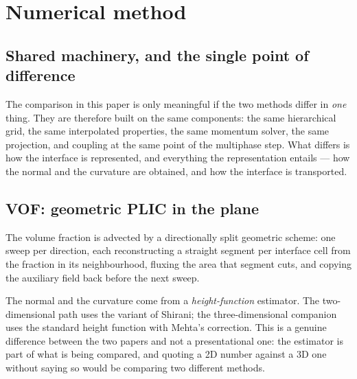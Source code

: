 \section{Numerical method}\label{sec:method}


\subsection{Shared machinery, and the single point of difference}

The comparison in this paper is only meaningful if the two methods differ in
\emph{one} thing. They are therefore built on the same components: the same
hierarchical grid, the same interpolated properties, the same momentum solver,
the same projection, and coupling at the same point of the multiphase step.
What differs is how the interface is represented, and everything the
representation entails --- how the normal and the curvature are obtained, and
how the interface is transported.


\subsection{VOF: geometric PLIC in the plane}

The volume fraction is advected by a directionally split geometric scheme: one
sweep per direction, each reconstructing a straight segment per interface cell
from the fraction in its neighbourhood, fluxing the area that segment cuts, and
copying the auxiliary field back before the next sweep.

The normal and the curvature come from a \emph{height-function} estimator. The
two-dimensional path uses the variant of Shirani; the three-dimensional
companion uses the standard height function with Mehta's correction. This is a
genuine difference between the two papers and not a presentational one: the
estimator is part of what is being compared, and quoting a 2D number against a
3D one without saying so would be comparing two different methods.

